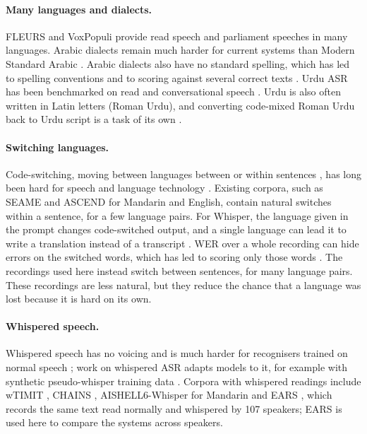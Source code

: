 \documentclass[11pt]{article}
\begin{document}
\paragraph{Many languages and dialects.} FLEURS \citep{conneau2023fleurs} and VoxPopuli \citep{wang2021voxpopuli} provide read speech and parliament speeches in many languages. Arabic dialects remain much harder for current systems than Modern Standard Arabic \citep{talafha2024casablanca,alharbi2024sada}. Arabic dialects also have no standard spelling, which has led to spelling conventions \citep{habash2012coda} and to scoring against several correct texts \citep{ali2015multireference}. Urdu ASR has been benchmarked on read and conversational speech \citep{arif2025werwestand}. Urdu is also often written in Latin letters (Roman Urdu), and converting code-mixed Roman Urdu back to Urdu script is a task of its own \citep{wisal2022cmrutu}.

\paragraph{Switching languages.} Code-switching, moving between languages between or within sentences \citep{poplack1980sometimes}, has long been hard for speech and language technology \citep{winata2023decades}. Existing corpora, such as SEAME \citep{lyu2010seame} and ASCEND \citep{lovenia2022ascend} for Mandarin and English, contain natural switches within a sentence, for a few language pairs. For Whisper, the language given in the prompt changes code-switched output, and a single language can lead it to write a translation instead of a transcript \citep{peng2023prompting}. WER over a whole recording can hide errors on the switched words, which has led to scoring only those words \citep{ugan2025pier}. The recordings used here instead switch between sentences, for many language pairs. These recordings are less natural, but they reduce the chance that a language was lost because it is hard on its own.

\paragraph{Whispered speech.} Whispered speech has no voicing and is much harder for recognisers trained on normal speech \citep{lim2011whisper}; work on whispered ASR adapts models to it, for example with synthetic pseudo-whisper training data \citep{ghaffarzadegan2016whisper}. Corpora with whispered readings include wTIMIT \citep{lim2011whisper}, CHAINS \citep{cummins2006chains}, AISHELL6-Whisper for Mandarin \citep{li2026aishell6whisper} and EARS \citep{richter2024ears}, which records the same text read normally and whispered by 107 speakers; EARS is used here to compare the systems across speakers.
\end{document}
